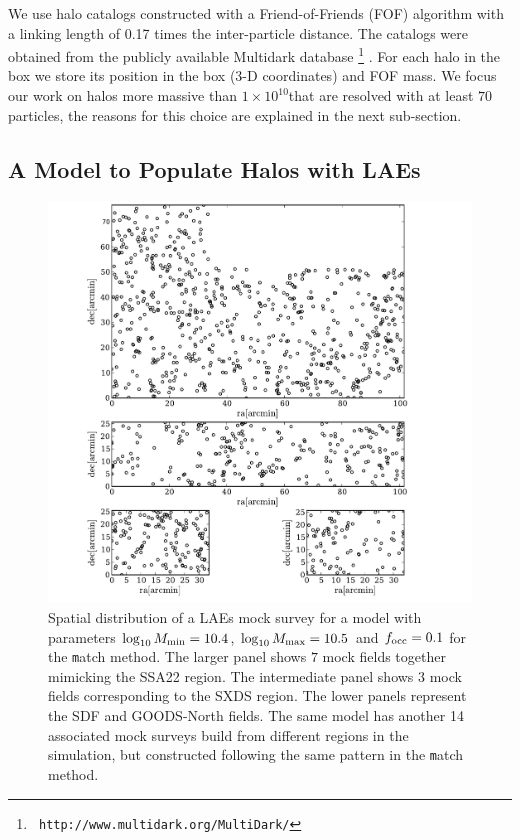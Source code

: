 \documentclass[usenatbib]{mn2e}
\newcommand{\hMsun}{{\ifmmode{h^{-1}{\rm
        {M_{\odot}}}}\else{$h^{-1}{\rm{M_{\odot}}}$}\fi}}
\begin{document}
We use halo catalogs constructed with a Friend-of-Friends (FOF)
algorithm with a linking length of 0.17 times the inter-particle
distance. The catalogs were obtained from the publicly available
Multidark database \footnote{{\tt
    http://www.multidark.org/MultiDark/}}
\citep{2011arXiv1109.0003R}. For each halo in the box we store its
position in the box (3-D coordinates) and FOF mass. We focus our work
on halos more massive than $1\times 10^{10}$\hMsun that are resolved
with at least $70$ particles, the reasons for this choice are
explained in the next sub-section.  


\subsection{A Model to Populate Halos with LAEs}
\label{subsec:mocks}



\begin{figure}
\begin{center}
\includegraphics[width=0.8\linewidth,angle=0]{./plots/Figure0.pdf}
\caption{ \label{fig:distros} Spatial distribution of a LAEs mock
  survey for a model with parameters $\log_{10}M_{\rm min}=10.4$, $\log_{10}M_{\rm
    max}=10.5$ and $f_{\rm occ}=0.1$ for the {\texttt match}
  method. The larger panel shows $7$ mock
  fields together mimicking the SSA22 region. The intermediate panel
  shows $3$ mock fields corresponding to the SXDS region. The lower
  panels represent the SDF and GOODS-North fields. The same model has
  another 14 associated mock surveys build from different regions in
  the simulation, but constructed following the same pattern in the
  {\texttt match} method.}
\end{center} 
\end{figure}
\end{document}
